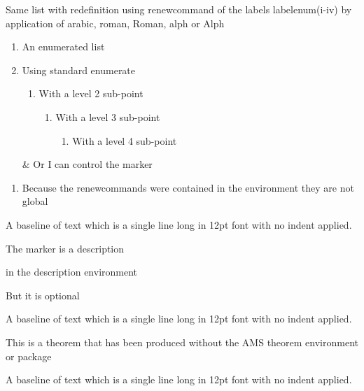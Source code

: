 Same list with redefinition using renewcommand of the labels labelenum(i-iv) by application of arabic, roman, Roman, alph or Alph
\begin{enumerate}
\renewcommand{\labelenumi}{\Roman{enumi}.}
\renewcommand{\labelenumii}{\roman{enumii}.}
\renewcommand{\labelenumiii}{\Alph{enumiii}.}
\renewcommand{\labelenumiv}{\alph{enumiv}.}
\item An enumerated list
\item Using standard enumerate
\begin{enumerate}
\item With a level 2 sub-point
\begin{enumerate}
\item With a level 3 sub-point
\begin{enumerate}
\item With a level 4 sub-point
\end{enumerate}
\end{enumerate}
\end{enumerate}
\item[\&] Or I can control the marker
\end{enumerate}

\begin{enumerate}
\item Because the renewcommands were contained in the environment they are not global
\end{enumerate}

\noindent
A baseline of text which is a single line long in 12pt font with no indent applied.

\begin{description}
\item[first] The marker is a description
\item[second] in the description environment
\item But it is optional
\end{description}


\noindent
A baseline of text which is a single line long in 12pt font with no indent applied.

\begin{theorem}
This is a theorem that has been produced without the AMS theorem environment or package
\end{theorem}

\noindent
A baseline of text which is a single line long in 12pt font with no indent applied.

